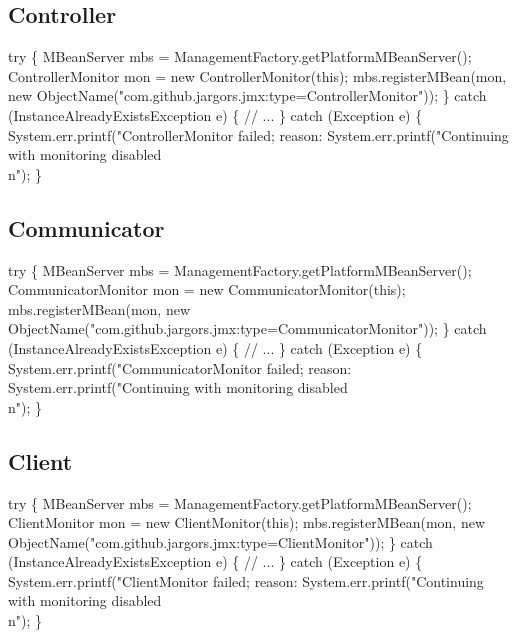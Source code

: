 \subsection{Controller}
\nwenddocs{}\endmoddef{}
try \{
  MBeanServer mbs = ManagementFactory.getPlatformMBeanServer();
  ControllerMonitor mon = new ControllerMonitor(this);
  mbs.registerMBean(mon, new ObjectName("com.github.jargors.jmx:type=ControllerMonitor"));
\} catch (InstanceAlreadyExistsException e) \{
  // ...
\} catch (Exception e) \{
  System.err.printf("ControllerMonitor failed; reason: %
  System.err.printf("Continuing with monitoring disabled\\n");
\}
\nwendcode{}\nwdocspar

\subsection{Communicator}
\nwenddocs{}\endmoddef{}
try \{
  MBeanServer mbs = ManagementFactory.getPlatformMBeanServer();
  CommunicatorMonitor mon = new CommunicatorMonitor(this);
  mbs.registerMBean(mon, new ObjectName("com.github.jargors.jmx:type=CommunicatorMonitor"));
\} catch (InstanceAlreadyExistsException e) \{
  // ...
\} catch (Exception e) \{
  System.err.printf("CommunicatorMonitor failed; reason: %
  System.err.printf("Continuing with monitoring disabled\\n");
\}
\nwendcode{}\nwdocspar

\subsection{Client}
\nwenddocs{}\endmoddef{}
try \{
  MBeanServer mbs = ManagementFactory.getPlatformMBeanServer();
  ClientMonitor mon = new ClientMonitor(this);
  mbs.registerMBean(mon, new ObjectName("com.github.jargors.jmx:type=ClientMonitor"));
\} catch (InstanceAlreadyExistsException e) \{
  // ...
\} catch (Exception e) \{
  System.err.printf("ClientMonitor failed; reason: %
  System.err.printf("Continuing with monitoring disabled\\n");
\}
\nwendcode{}\nwdocspar

